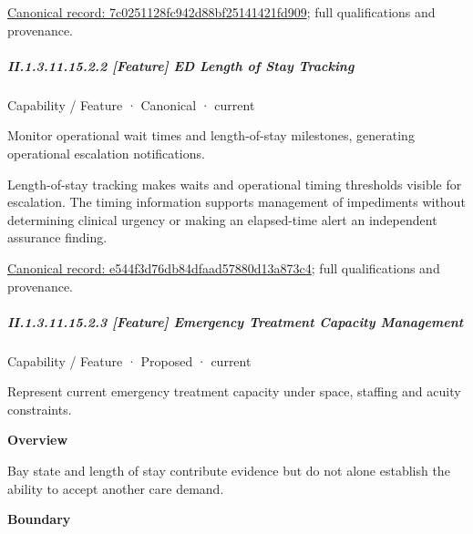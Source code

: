 {\footnotesize \href{../../../../continuum/strategy/capability/feature/7c0251128fc942d88bf25141421fd909.md}{Canonical record: 7c0251128fc942d88bf25141421fd909}; full qualifications and provenance.}\par
\subparagraph*{II.1.3.11.15.2.2 [Feature] ED Length of Stay Tracking}
\label{navigation:II.1.3.11.15.2.2}

\label{element:e544f3d76db84dfaad57880d13a873c4}
{\small Capability / Feature · Canonical · current}\par

Monitor operational wait times and length-of-stay milestones, generating operational escalation notifications.



Length-of-stay tracking makes waits and operational timing thresholds visible for escalation. The timing information supports management of impediments without determining clinical urgency or making an elapsed-time alert an independent assurance finding.


{\footnotesize \href{../../../../continuum/strategy/capability/feature/e544f3d76db84dfaad57880d13a873c4.md}{Canonical record: e544f3d76db84dfaad57880d13a873c4}; full qualifications and provenance.}\par
\subparagraph*{II.1.3.11.15.2.3 [Feature] Emergency Treatment Capacity Management}
\label{navigation:II.1.3.11.15.2.3}

\label{element:502876430cf747f4b3bb102fb69557a5}
{\small Capability / Feature · Proposed · current}\par

Represent current emergency treatment capacity under space, staffing and acuity constraints.



\textbf{Overview}



Bay state and length of stay contribute evidence but do not alone establish the ability to accept another care demand.



\textbf{Boundary}



